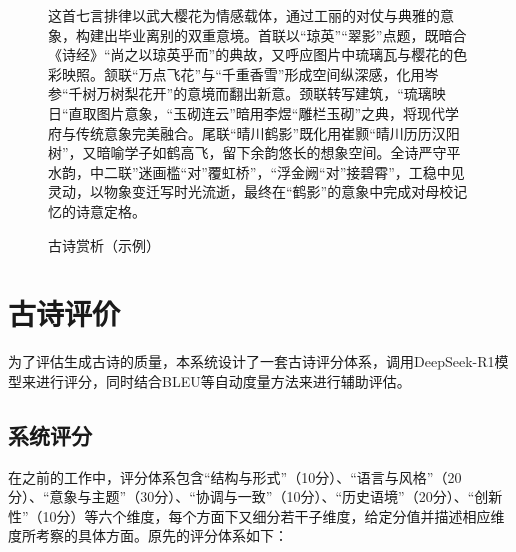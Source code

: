 \begin{figure}[ht]
  \begin{tcolorbox}[
      colback=white, %
      colframe=black, 
      boxrule=1pt,        %
      arc=0mm,             %
  ]
      \kaishu 这首七言排律以武大樱花为情感载体，通过工丽的对仗与典雅的意象，构建出毕业离别的双重意境。首联以“琼英”“翠影”点题，既暗合《诗经》“尚之以琼英乎而”的典故，又呼应图片中琉璃瓦与樱花的色彩映照。颔联“万点飞花”与“千重香雪”形成空间纵深感，化用岑参“千树万树梨花开”的意境而翻出新意。颈联转写建筑，“琉璃映日“直取图片意象，“玉砌连云”暗用李煜“雕栏玉砌”之典，将现代学府与传统意象完美融合。尾联“晴川鹤影”既化用崔颢“晴川历历汉阳树”，又暗喻学子如鹤高飞，留下余韵悠长的想象空间。全诗严守平水韵，中二联”迷画槛“对”覆虹桥”，“浮金阙“对”接碧霄”，工稳中见灵动，以物象变迁写时光流逝，最终在“鹤影”的意象中完成对母校记忆的诗意定格。
  \end{tcolorbox}
  \caption{古诗赏析（示例）}
  \label{fig:example_appreciation} %
\end{figure}

\section{古诗评价} \label{sec:poem_analysis}

为了评估生成古诗的质量，本系统设计了一套古诗评分体系，调用DeepSeek-R1模型来进行评分，同时结合BLEU等自动度量方法来进行辅助评估。

\subsection{系统评分}

在之前的工作中，评分体系包含“结构与形式”（10分）、“语言与风格”（20分）、“意象与主题”（30分）、“协调与一致”（10分）、“历史语境”（20分）、“创新性”（10分）等六个维度，每个方面下又细分若干子维度，给定分值并描述相应维度所考察的具体方面。原先的评分体系如下：

